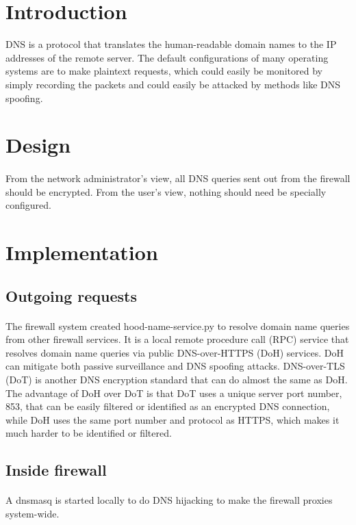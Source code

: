 \documentclass[mscthesis]{usiinfthesis}
\begin{document}
\section{Introduction}
DNS is a protocol that translates the human-readable domain names to the IP addresses of the remote server. The default configurations of many operating systems are to make plaintext requests, which could easily be monitored by simply recording the packets and could easily be attacked by methods like DNS spoofing.

\section{Design}
\paragraph{}
From the network administrator's view, all DNS queries sent out from the firewall should be encrypted. From the user's view, nothing should need be specially configured.

\section{Implementation}
\subsection{Outgoing requests}
\paragraph{}
The firewall system created hood-name-service.py to resolve domain name queries from other firewall services. It is a local remote procedure call (RPC) service that resolves domain name queries via public DNS-over-HTTPS (DoH) services. DoH can mitigate both passive surveillance and DNS spoofing attacks\citep{rfc:doh8}. DNS-over-TLS (DoT) is another DNS encryption standard that can do almost the same as DoH. The advantage of DoH over DoT is that DoT uses a unique server port number, 853, that can be easily filtered or identified as an encrypted DNS connection, while DoH uses the same port number and protocol as HTTPS, which makes it much harder to be identified or filtered.
\subsection{Inside firewall}
\paragraph{}
A dnsmasq is started locally to do DNS hijacking to make the firewall proxies system-wide.
\end{document}
